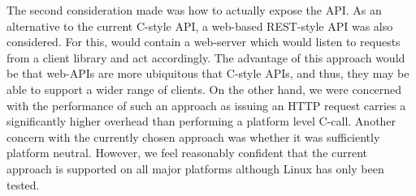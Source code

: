 The second consideration made was how to actually expose the API. As an
alternative to the current C-style API, a web-based REST-style API was also
considered. For this, \libsme{} would contain a web-server which would
listen to requests from a client library and act accordingly. The advantage of
this approach would be that web-APIs are more ubiquitous that C-style APIs, and
thus, they may be able to support a wider range of clients. On the other hand,
we were concerned with the performance of such an approach as issuing an HTTP
request carries a significantly higher overhead than performing a platform level
C-call. Another concern with the currently chosen approach was whether it was
sufficiently platform neutral. However, we feel reasonably confident that the
current approach is supported on all major platforms although Linux has only
been tested.



